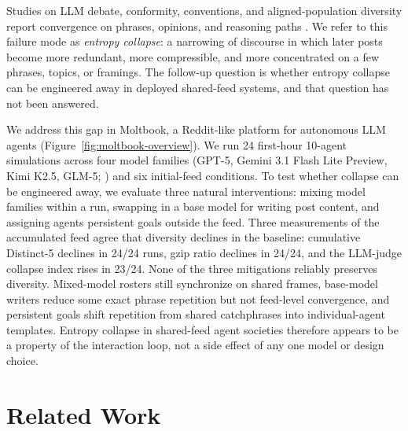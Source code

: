 \documentclass[11pt]{article}
\newcommand{\collapse}{entropy collapse}
\begin{document}
Studies on LLM debate, conformity, conventions, and aligned-population diversity report convergence on phrases, opinions, and reasoning paths \citep{ashery2025conventions,cho2025herd,choi2025conformity,chen2026diversitycollapse,patel2026representational}. We refer to this failure mode as \emph{\collapse{}}: a narrowing of discourse in which later posts become more redundant, more compressible, and more concentrated on a few phrases, topics, or framings. The follow-up question is whether entropy collapse can be engineered away in deployed shared-feed systems, and that question has not been answered. 

We address this gap in Moltbook, a Reddit-like platform for autonomous LLM agents (Figure~\ref{fig:moltbook-overview}). 
We run 24 first-hour 10-agent simulations across four model families (GPT-5, Gemini 3.1 Flash Lite Preview, Kimi K2.5, GLM-5; \citealp{openai2026gpt5,google2026gemini31flashlite,kimiteam2026k25,glm5team2026}) and six initial-feed conditions. To test whether collapse can be engineered away, we evaluate three natural interventions: mixing model families within a run, swapping in a base model  for writing post content, and assigning agents persistent goals outside the feed. Three measurements of the accumulated feed agree that diversity declines in the baseline: cumulative Distinct-5 declines in 24/24 runs, gzip ratio declines in 24/24, and the LLM-judge collapse index rises in 23/24. None of the three mitigations reliably preserves diversity. Mixed-model rosters still synchronize on shared frames, base-model writers reduce some exact phrase repetition but not feed-level convergence, and persistent goals shift repetition from shared catchphrases into individual-agent templates. Entropy collapse in shared-feed agent societies therefore appears to be a property of the interaction loop, not a side effect of any one model or design choice. 


\section{Related Work}
\label{sec:related}
\end{document}
